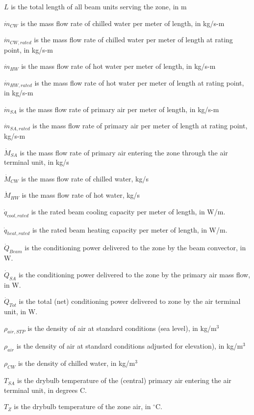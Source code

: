 \({L}\) is the total length of all beam units serving the zone, in m

\({\dot m_{CW}}\) is the mass flow rate of chilled water per meter of length, in kg/s-m

\({\dot m_{CW,rated}}\) is the mass flow rate of chilled water per meter of length at rating point, in kg/s-m

\({\dot m_{HW}}\) is the mass flow rate of hot water per meter of length, in kg/s-m

\({\dot m_{HW,rated}}\) is the mass flow rate of hot water per meter of length at rating point, in kg/s-m

\({\dot m_{SA}}\) is the mass flow rate of primary air per meter of length, in kg/s-m

\({\dot m_{SA,rated}}\) is the mass flow rate of primary air per meter of length at rating point, kg/s-m

\({\dot M_{SA}}\) is the mass flow rate of primary air entering the zone through the air terminal unit, in kg/s

\({\dot M_{CW}}\) is the mass flow rate of chilled water, kg/s

\({\dot M_{HW}}\) is the mass flow rate of hot water, kg/s

\({\dot q_{cool,rated}}\) is the rated beam cooling capacity per meter of length, in W/m.

\({\dot q_{heat,rated}}\) is the rated beam heating capacity per meter of length, in W/m.

\({\dot Q_{Beam}}\) is the conditioning power delivered to the zone by the beam convector, in W.

\({\dot Q_{SA}}\) is the conditioning power delivered to the zone by the primary air mass flow, in W.

\({\dot Q_{Tot}}\) is the total (net) conditioning power delivered to zone by the air terminal unit, in W.

\({\rho_{air,STP}}\) is the density of air at standard conditions (sea level), in kg/m\(^{3}\)

\({\rho_{air}}\) is the density of air at standard conditions adjusted for elevation), in kg/m\(^{3}\)

\({\rho_{CW}}\) is the density of chilled water, in kg/m\(^{3}\)

\({T_{SA}}\) is the drybulb temperature of the (central) primary air entering the air terminal unit, in degrees C.

\({T_{Z}}\) is the drybulb temperature of the zone air, in  \(^{\circ}\)C.

